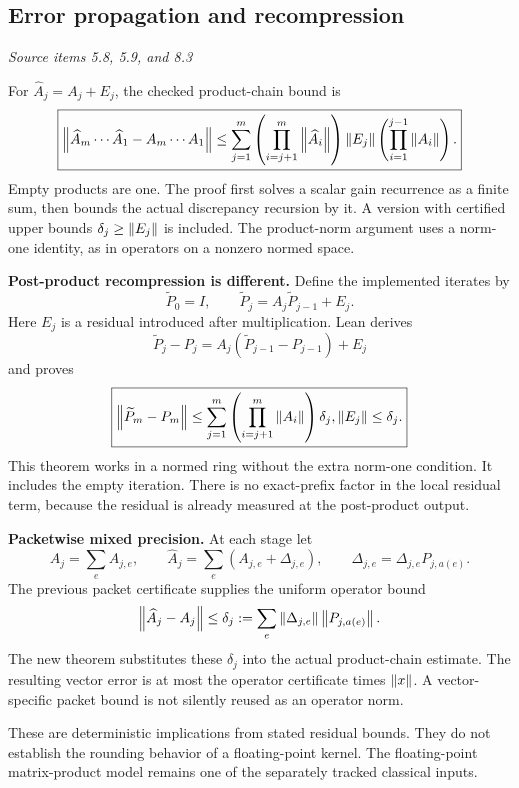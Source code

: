 \subsection{Error propagation and recompression}\label{supp3:subsection:002}\textit{Source items 5.8, 5.9, and 8.3}\par
For $\widehat A_j=A_j+E_j$, the checked product-chain bound is
\[
\boxed{
\left\lVert\widehat A_m\cdots\widehat A_1-A_m\cdots A_1\right\rVert
\leq\sum_{j=1}^m
 \left(\prod_{i=j+1}^m\left\lVert\widehat A_i\right\rVert\right)
 \left\lVert E_j\right\rVert
 \left(\prod_{i=1}^{j-1}\left\lVert A_i\right\rVert\right).}
\]
Empty products are one. The proof first solves a scalar gain recurrence as a finite sum, then bounds the actual discrepancy recursion by it. A version with certified upper bounds $\delta_j\geq\left\lVert E_j\right\rVert$ is included. The product-norm argument uses a norm-one identity, as in operators on a nonzero normed space.

\textbf{Post-product recompression is different.} Define the implemented iterates by
\[
\widetilde P_0=I,\qquad
\widetilde P_j=A_j\widetilde P_{j-1}+E_j.
\]
Here $E_j$ is a residual introduced after multiplication. Lean derives
\[
\widetilde P_j-P_j=A_j(\widetilde P_{j-1}-P_{j-1})+E_j
\]
and proves
\[
\boxed{\left\lVert\widetilde P_m-P_m\right\rVert
\leq\sum_{j=1}^m\left(\prod_{i=j+1}^m\left\lVert A_i\right\rVert\right)\delta_j,
 \left\lVert E_j\right\rVert\leq\delta_j.}
\]
This theorem works in a normed ring without the extra norm-one condition. It includes the empty iteration. There is no exact-prefix factor in the local residual term, because the residual is already measured at the post-product output.

\textbf{Packetwise mixed precision.} At each stage let
\[
A_j=\sum_e A_{j,e},\qquad
\widehat A_j=\sum_e(A_{j,e}+\Delta_{j,e}),\qquad
\Delta_{j,e}=\Delta_{j,e}P_{j,a(e)}.
\]
The previous packet certificate supplies the uniform operator bound
\[
\left\lVert\widehat A_j-A_j\right\rVert\leq
\delta_j:=\sum_e\left\lVert\Delta_{j,e}\right\rVert\left\lVert P_{j,a(e)}\right\rVert.
\]
The new theorem substitutes these $\delta_j$ into the actual product-chain estimate. The resulting vector error is at most the operator certificate times $\left\lVert x\right\rVert$. A vector-specific packet bound is not silently reused as an operator norm.

These are deterministic implications from stated residual bounds. They do not establish the rounding behavior of a floating-point kernel. The floating-point matrix-product model remains one of the separately tracked classical inputs.



